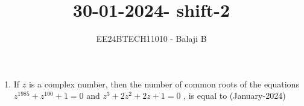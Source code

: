 \documentclass[journal]{IEEEtran}
\begin{document}

\vspace{3cm}

\title{30-01-2024- shift-2}
\author{EE24BTECH11010 - Balaji B}
{\let\newpage\relax\maketitle}
\begin{enumerate}
    \item If $z$
 is a complex number, then the number of common roots of the equations $z^{1985} + z^{100} + 1 = 0 $ and $z^3 + 2z^2 + 2z + 1 = 0 $ 
, is equal to \hfill (January-2024)
\begin{enumerate}
\end{enumerate}


\end{enumerate}
\end{document}
